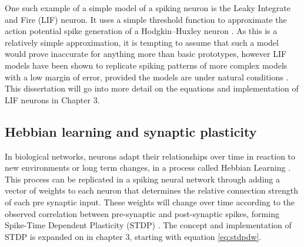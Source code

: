 One such example of a simple model of a spiking neuron is the Leaky Integrate
and Fire (LIF) neuron. It uses a simple threshold function to approximate the
action potential spike generation of a Hodgkin–Huxley neuron
\autocite{trappenberg_fundamentals_2009}. As this is a relatively simple
approximation, it is tempting to assume that such a model would prove inaccurate
for anything more than basic prototypes, however LIF models have been shown to
replicate spiking patterns of more complex models with a low margin of error,
provided the models are under natural conditions
\autocite{teeter_generalized_2018}. This dissertation will go into more detail on
the equations and implementation of LIF neurons in Chapter 3. %

\subsection{Hebbian learning and synaptic plasticity}

In biological networks, neurons adapt their relationships over time in reaction
to new environments or long term changes, in a process called Hebbian Learning
\autocite{trappenberg_fundamentals_2009}. This process can be replicated in a
spiking neural network through adding a vector of weights to each neuron that
determines the relative connection strength of each pre synaptic input. These
weights will change over time according to the observed correlation between
pre-synaptic and post-synaptic spikes, forming Spike-Time Dependent Plasticity
(STDP) \autocite{iakymchuk_simplified_2015}. The concept and implementation of STDP is expanded on in chapter 3, starting with
equation \ref{eq:stdpdw}.

